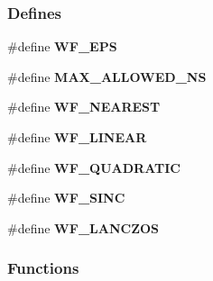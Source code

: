 \subsubsection*{Defines}
\begin{CompactItemize}
\item 
\#define {\bf WF\_\-EPS}
\item 
\#define {\bf MAX\_\-ALLOWED\_\-NS}
\item 
\#define {\bf WF\_\-NEAREST}
\item 
\#define {\bf WF\_\-LINEAR}
\item 
\#define {\bf WF\_\-QUADRATIC}
\item 
\#define {\bf WF\_\-SINC}
\item 
\#define {\bf WF\_\-LANCZOS}
\end{CompactItemize}
\subsubsection*{Functions}
